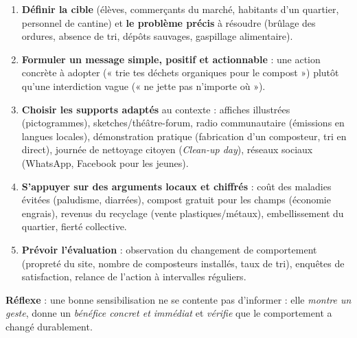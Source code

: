 \documentclass[11pt]{article}
\begin{document}
\begin{methode}
\begin{enumerate}
\item \textbf{Définir la cible} (élèves, commerçants du marché, habitants d'un quartier, personnel de cantine) et \textbf{le problème précis} à résoudre (brûlage des ordures, absence de tri, dépôts sauvages, gaspillage alimentaire).
\item \textbf{Formuler un message simple, positif et actionnable} : une action concrète à adopter (« trie tes déchets organiques pour le compost ») plutôt qu'une interdiction vague (« ne jette pas n'importe où »).
\item \textbf{Choisir les supports adaptés} au contexte : affiches illustrées (pictogrammes), sketches/théâtre-forum, radio communautaire (émissions en langues locales), démonstration pratique (fabrication d'un composteur, tri en direct), journée de nettoyage citoyen (\emph{Clean-up day}), réseaux sociaux (WhatsApp, Facebook pour les jeunes).
\item \textbf{S'appuyer sur des arguments locaux et chiffrés} : coût des maladies évitées (paludisme, diarrées), compost gratuit pour les champs (économie engrais), revenus du recyclage (vente plastiques/métaux), embellissement du quartier, fierté collective.
\item \textbf{Prévoir l'évaluation} : observation du changement de comportement (propreté du site, nombre de composteurs installés, taux de tri), enquêtes de satisfaction, relance de l'action à intervalles réguliers.
\end{enumerate}
\textbf{Réflexe} : une bonne sensibilisation ne se contente pas d'informer : elle \emph{montre un geste}, donne un \emph{bénéfice concret et immédiat} et \emph{vérifie} que le comportement a changé durablement.
\end{methode}
\end{document}
